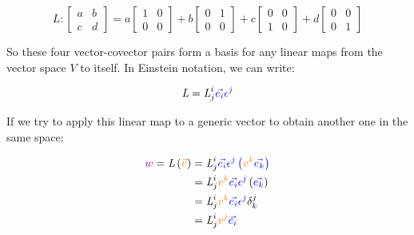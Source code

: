 \begin{equation}
    \textit{L} : \begin{bmatrix}
        a & b\\
        c & d
    \end{bmatrix} = 
    a
    \begin{bmatrix}
        1 & 0\\
        0 & 0
    \end{bmatrix} + b
    \begin{bmatrix}
        0 & 1\\
        0 & 0
    \end{bmatrix} + c
    \begin{bmatrix}
        0 & 0\\
        1 & 0
    \end{bmatrix} + d
    \begin{bmatrix}
        0 & 0\\
        0 & 1
    \end{bmatrix}
\end{equation}

So these four vector-covector pairs form a basis for any linear maps from the vector space $V$ to itself.
In Einstein notation, we can write:

\begin{equation}
    \textit{L} = \textit{L}^i_j \color{blue} \vec{e_i} \epsilon^j
\end{equation}

If we try to apply this linear map to a generic vector to obtain another one in the same space:

\begin{align*}
    \begingroup\color{violet}w\endgroup = \textit{L}\left(\begingroup\color{orange}\vec{v}\endgroup\right) &= 
    \textit{L}^i_j \color{blue} \vec{e_i} \epsilon^j \left(\begingroup\color{orange}v^k\endgroup \begingroup\color{blue}\vec{e_k}\endgroup\right)\\
    &= \textit{L}^i_j \begingroup\color{orange}v^k\endgroup \begingroup\color{blue}\vec{e_i}\endgroup \begingroup\color{blue}\epsilon^j\endgroup \left(\begingroup\color{blue}\vec{e_k}\endgroup\right)\\
    &= \textit{L}^i_j \begingroup\color{orange}v^k\endgroup \begingroup\color{blue}\vec{e_i}\endgroup \begingroup\color{blue}\epsilon^j\endgroup \delta^j_k\\
    &= \textit{L}^i_j \begingroup\color{orange}v^j\endgroup\begingroup\color{blue}\vec{e_i}\endgroup
\end{align*}

